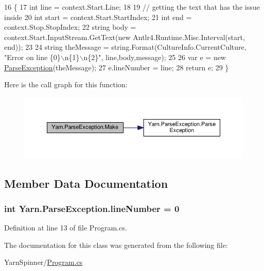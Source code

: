 \begin{DoxyCode}
16         \{
17             \textcolor{keywordtype}{int} line = context.Start.Line;
18 
19             \textcolor{comment}{// getting the text that has the issue inside}
20             \textcolor{keywordtype}{int} start = context.Start.StartIndex;
21             \textcolor{keywordtype}{int} end = context.Stop.StopIndex;
22             \textcolor{keywordtype}{string} body = context.Start.InputStream.GetText(\textcolor{keyword}{new} Antlr4.Runtime.Misc.Interval(start, end));
23 
24             \textcolor{keywordtype}{string} theMessage = string.Format(CultureInfo.CurrentCulture, \textcolor{stringliteral}{"Error on line \{0\}\(\backslash\)n\{1\}\(\backslash\)n\{2\}"}, 
      line,body,message);
25 
26             var e = \textcolor{keyword}{new} \hyperlink{a00135_aa3c4f5c8b0ae86097bbc46044df9f317}{ParseException}(theMessage);
27             e.lineNumber = line;
28             \textcolor{keywordflow}{return} e;
29         \}
\end{DoxyCode}


Here is the call graph for this function\-:
\nopagebreak
\begin{figure}[H]
\begin{center}
\leavevmode
\includegraphics[width=350pt]{a00135_a0265905b09fbd675d40c452d9fc61207_cgraph}
\end{center}
\end{figure}




\subsection{Member Data Documentation}
\hypertarget{a00135_ab335169367e64fd6d89d58b3ac573751}{
\subsubsection[{line\-Number}]{\setlength{\rightskip}{0pt plus 5cm}int Yarn.\-Parse\-Exception.\-line\-Number = 0\hspace{0.3cm}{\ttfamily [package]}}}\label{a00135_ab335169367e64fd6d89d58b3ac573751}


Definition at line 13 of file Program.\-cs.



The documentation for this class was generated from the following file\-:\begin{DoxyCompactItemize}
\item 
Yarn\-Spinner/\hyperlink{a00289}{Program.\-cs}\end{DoxyCompactItemize}
